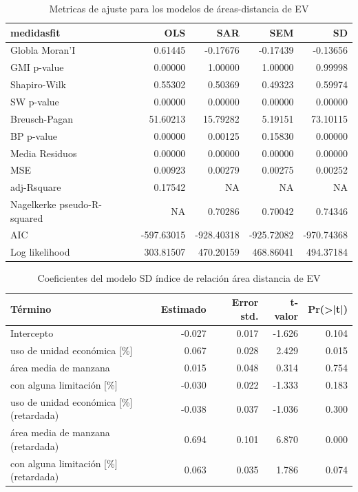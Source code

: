 \documentclass[12pt,a4paper,openany]{book}
\theoremstyle{definition}
\theoremstyle{definition}
\theoremstyle{definition}
\theoremstyle{remark}
\begin{document}
\begin{table}[H]

\caption{\label{tab:tabla-comp-modelos-areasdist}Metricas de ajuste para los modelos de áreas-distancia de EV}
\centering
\begin{tabular}{lrrrr}
\toprule
medidasfit & OLS & SAR & SEM & SD\\
\midrule
Globla Moran'I & 0.61445 & -0.17676 & -0.17439 & -0.13656\\
GMI p-value & 0.00000 & 1.00000 & 1.00000 & 0.99998\\
Shapiro-Wilk & 0.55302 & 0.50369 & 0.49323 & 0.59974\\
SW p-value & 0.00000 & 0.00000 & 0.00000 & 0.00000\\
Breusch-Pagan & 51.60213 & 15.79282 & 5.19151 & 73.10115\\
\addlinespace
BP p-value & 0.00000 & 0.00125 & 0.15830 & 0.00000\\
Media Residuos & 0.00000 & 0.00000 & 0.00000 & 0.00000\\
MSE & 0.00923 & 0.00279 & 0.00275 & 0.00252\\
adj-Rsquare & 0.17542 & NA & NA & NA\\
Nagelkerke pseudo-R-squared & NA & 0.70286 & 0.70042 & 0.74346\\
\addlinespace
AIC & -597.63015 & -928.40318 & -925.72082 & -970.74368\\
Log likelihood & 303.81507 & 470.20159 & 468.86041 & 494.37184\\
\bottomrule
\end{tabular}
\end{table}

\begin{table}[H]

\caption{\label{tab:coef-sd-areasdist}Coeficientes del modelo SD índice de relación área distancia de EV}
\centering
\begin{tabular}{lrrrr}
\toprule
Término & Estimado & Error std. & t-valor & Pr(>|t|)\\
\midrule
Intercepto & -0.027 & 0.017 & -1.626 & 0.104\\
uso de unidad económica [\%] & 0.067 & 0.028 & 2.429 & 0.015\\
área media de manzana & 0.015 & 0.048 & 0.314 & 0.754\\
con alguna limitación [\%] & -0.030 & 0.022 & -1.333 & 0.183\\
uso de unidad económica [\%] (retardada) & -0.038 & 0.037 & -1.036 & 0.300\\
\addlinespace
área media de manzana (retardada) & 0.694 & 0.101 & 6.870 & 0.000\\
con alguna limitación [\%] (retardada) & 0.063 & 0.035 & 1.786 & 0.074\\
\bottomrule
\end{tabular}
\end{table}
\end{document}
